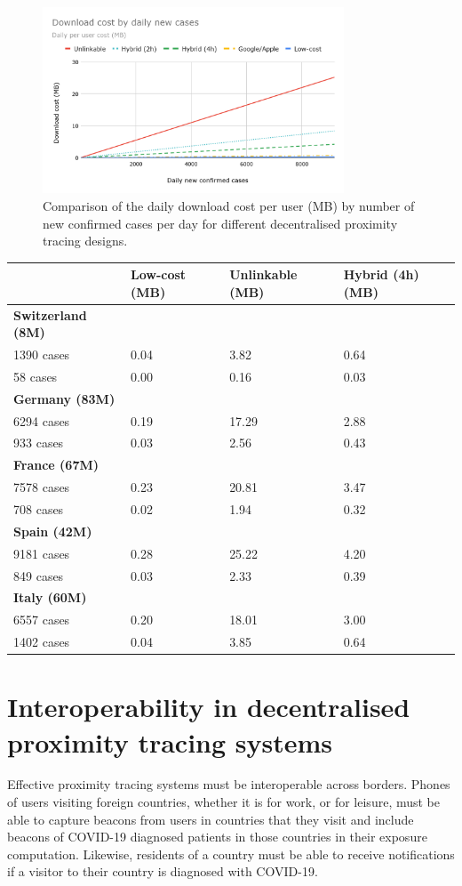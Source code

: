 \documentclass{article}
\begin{document}
\begin{figure}\centering
\includegraphics[width=0.8\textwidth]{figs/comparison_decentralized.png}
\caption{Comparison of the daily download cost per user (MB)
by number of new confirmed cases per day for different decentralised
proximity tracing designs.}
\label{fig:comp_decentralized}
\end{figure}


\begin{tabular}[]{@{}llll@{}}
\toprule
& \textbf{Low-cost (MB)} & \textbf{Unlinkable (MB)} & \textbf{Hybrid
(4h) (MB)}\tabularnewline
\midrule
\textbf{Switzerland (8M)} & & &\tabularnewline
1390 cases & 0.04 & 3.82 & 0.64\tabularnewline
58 cases & 0.00 & 0.16 & 0.03\tabularnewline
\textbf{Germany (83M)} & & &\tabularnewline
6294 cases & 0.19 & 17.29 & 2.88\tabularnewline
933 cases & 0.03 & 2.56 & 0.43\tabularnewline
\textbf{France (67M)} & & &\tabularnewline
7578 cases & 0.23 & 20.81 & 3.47\tabularnewline
708 cases & 0.02 & 1.94 & 0.32\tabularnewline
\textbf{Spain (42M)} & & &\tabularnewline
9181 cases & 0.28 & 25.22 & 4.20\tabularnewline
849 cases & 0.03 & 2.33 & 0.39\tabularnewline
\textbf{Italy (60M)} & & &\tabularnewline
6557 cases & 0.20 & 18.01 & 3.00\tabularnewline
1402 cases & 0.04 & 3.85 & 0.64\tabularnewline
\bottomrule
\end{tabular}

\section{Interoperability in decentralised proximity tracing
systems}\label{interoperability-in-decentralised-proximity-tracing-systems}

Effective proximity tracing systems must be interoperable across
borders. Phones of users visiting foreign countries, whether it is for
work, or for leisure, must be able to capture beacons from users in
countries that they visit and include beacons of COVID-19 diagnosed
patients in those countries in their exposure computation. Likewise,
residents of a country must be able to receive notifications if a
visitor to their country is diagnosed with COVID-19.
\end{document}
